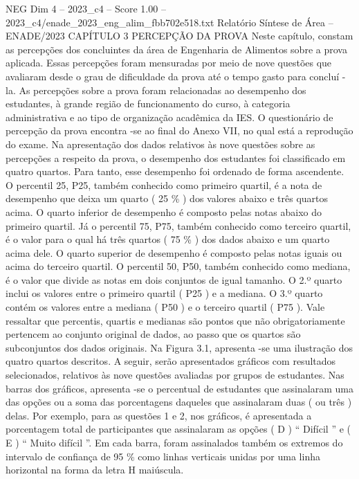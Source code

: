 \begin{textsample}{NEG Dim 4 – 2023\_c4 – Score 1.00 – 2023\_c4/enade\_2023\_eng\_alim\_fbb702e518.txt}  \label{ex:f4_neg_190}
Relatório Síntese de Área – ENADE/2023 CAPÍTULO 3 PERCEPÇÃO DA PROVA Neste capítulo, constam as percepções dos concluintes da área de Engenharia de Alimentos sobre a prova aplicada.
Essas percepções foram mensuradas por meio de nove questões que avaliaram desde o grau de dificuldade da prova até o tempo gasto para concluí -la.
As percepções sobre a prova foram relacionadas ao desempenho dos estudantes, à grande região de funcionamento do curso, à categoria administrativa e ao tipo de organização acadêmica da IES.
O questionário de percepção da prova encontra -se ao final do Anexo VII, no qual está a reprodução do exame.
Na apresentação dos dados relativos às nove questões sobre as percepções a respeito da prova, o desempenho dos estudantes foi classificado em quatro quartos.
Para tanto, esse desempenho foi ordenado de forma ascendente.
O percentil 25, P25, também conhecido como primeiro quartil, é a nota de desempenho que deixa um quarto ( 25 \% ) dos valores abaixo e três quartos acima.
O quarto inferior de desempenho é composto pelas notas abaixo do primeiro quartil.
Já o percentil 75, P75, também conhecido como terceiro quartil, é o valor para o qual há três quartos ( 75 \% ) dos dados abaixo e um quarto acima dele.
O quarto superior de desempenho é composto pelas notas iguais ou acima do terceiro quartil.
O percentil 50, P50, também conhecido como mediana, é o valor que divide as notas em dois conjuntos de igual tamanho.
O 2.º quarto inclui os valores entre o primeiro quartil ( P25 ) e a mediana.
O 3.º quarto contém os valores entre a mediana ( P50 ) e o terceiro quartil ( P75 ).
Vale ressaltar que percentis, quartis e medianas são pontos que não obrigatoriamente pertencem ao conjunto original de dados, ao passo que os quartos são subconjuntos dos dados originais.
Na Figura 3.1, apresenta -se uma ilustração dos quatro quartos descritos.
A seguir, serão apresentados gráficos com resultados selecionados, relativos às nove questões avaliadas por grupos de estudantes.
Nas barras dos gráficos, apresenta -se o percentual de estudantes que assinalaram uma das opções ou a soma das porcentagens daqueles que assinalaram duas ( ou três ) delas.
Por exemplo, para as questões 1 e 2, nos gráficos, é apresentada a porcentagem total de participantes que assinalaram as opções ( D ) “ Difícil ” e ( E ) “ Muito difícil ”.
Em cada barra, foram assinalados também os extremos do intervalo de confiança de 95 \% como linhas verticais unidas por uma linha horizontal na forma da letra H maiúscula.

\end{textsample}
